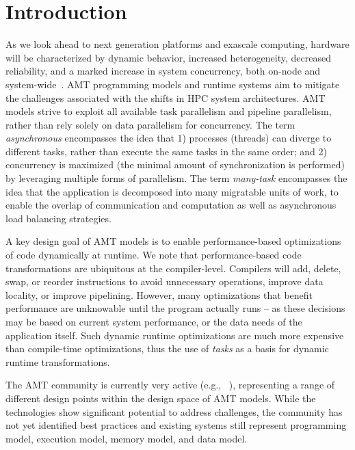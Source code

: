 \chapter{Introduction}
\label{chap:introduction}
As we look ahead to next generation platforms and exascale computing,  hardware 
will be characterized by dynamic behavior, increased
heterogeneity, decreased reliability, and a marked increase in system
\gls{concurrency}, both on-node and system-wide~\cite{doe_arch, dav_exascale}. 
\gls{AMT} \glspl{programming model} and \glspl{runtime system} 
aim to mitigate the challenges associated with the shifts in \gls{HPC} system architectures.  
\gls{AMT} models strive to exploit all available \gls{task parallelism} and
\gls{pipeline parallelism}, rather than rely solely on \gls{data parallelism}
for \gls{concurrency}. The term {\em \gls{asynchronous}} encompasses the idea that 
1) processes (threads) can diverge to different tasks, rather than execute 
the same tasks in the same order; and 2) \gls{concurrency} is maximized (the 
  minimal amount of synchronization is performed) by 
leveraging multiple forms of parallelism. The term {\em many-task} encompasses 
the idea that the application is decomposed into many 
\gls{migratable} units of work, to enable the overlap of communication and 
computation as well as asynchronous load balancing strategies.

A key design goal of \gls{AMT} models is to enable performance-based
optimizations of code dynamically at runtime.
We note that performance-based code transformations are ubiquitous at the compiler-level.
Compilers will add, delete, swap, or reorder instructions to avoid unnecessary operations, improve data locality, or improve pipelining.
However, many optimizations that benefit performance are unknowable until the program
actually runs -- as these decisions may be based on current system performance,
or the data needs of the application itself. Such dynamic runtime optimizations are much more expensive 
than compile-time optimizations, thus the use of \emph{tasks} as a basis
for dynamic runtime transformations. 


The \gls{AMT} community is currently very active (e.g.,
~\cite{OCR,STAPL,Legion,Realm,StencilHPX,Charm++,Uintah,Loci,PARSEC,DaGuE,Cilk}),
representing a range of different design points within the
design space of \gls{AMT} models. While the technologies show significant
potential to address challenges, the community has not yet identified best
practices and existing systems still represent \gls{programming model},
\gls{execution model}, \gls{memory model}, and \gls{data model}.  

